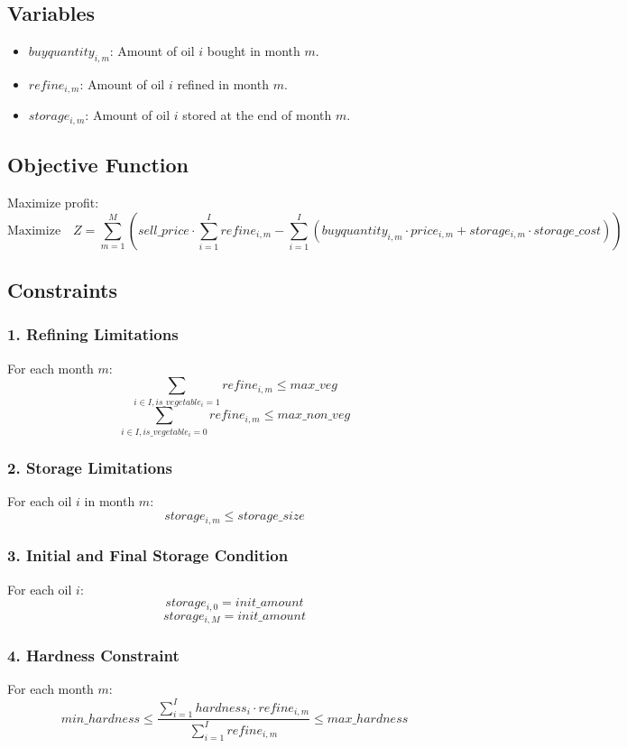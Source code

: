 \documentclass{article}
\begin{document}
\subsection*{Variables}
\begin{itemize}
    \item \( buyquantity_{i,m} \): Amount of oil \( i \) bought in month \( m \).
    \item \( refine_{i,m} \): Amount of oil \( i \) refined in month \( m \).
    \item \( storage_{i,m} \): Amount of oil \( i \) stored at the end of month \( m \).
\end{itemize}

\subsection*{Objective Function}
Maximize profit:
\[
\text{Maximize} \quad Z = \sum_{m=1}^{M} \left( sell\_price \cdot \sum_{i=1}^{I} refine_{i,m} - \sum_{i=1}^{I} (buyquantity_{i,m} \cdot price_{i,m} + storage_{i,m} \cdot storage\_cost) \right)
\]

\subsection*{Constraints}

\subsubsection*{1. Refining Limitations}
For each month \( m \):
\[
\sum_{i \in I, is\_vegetable_i=1} refine_{i,m} \leq max\_veg
\]
\[
\sum_{i \in I, is\_vegetable_i=0} refine_{i,m} \leq max\_non\_veg
\]

\subsubsection*{2. Storage Limitations}
For each oil \( i \) in month \( m \):
\[
storage_{i,m} \leq storage\_size
\]

\subsubsection*{3. Initial and Final Storage Condition}
For each oil \( i \):
\[
storage_{i,0} = init\_amount
\]
\[
storage_{i,M} = init\_amount
\]

\subsubsection*{4. Hardness Constraint}
For each month \( m \):
\[
min\_hardness \leq \frac{\sum_{i=1}^{I} hardness_{i} \cdot refine_{i,m}}{\sum_{i=1}^{I} refine_{i,m}} \leq max\_hardness
\]
\end{document}
